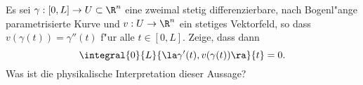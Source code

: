 \begin{prob}
Es sei $\gamma:[0,L]\to U\subset\R^n$ eine zweimal stetig differenzierbare, nach Bogenl"ange parametrisierte Kurve und $v:U\to\R^n$ ein stetiges Vektorfeld, so dass $v(\gamma(t))=\gamma''(t)$ f"ur alle $t\in[0,L]$.
Zeige, dass dann
$$
\integral{0}{L}{\la\gamma'(t),v(\gamma(t))\ra}{t}=0.
$$
Was ist die physikalische Interpretation dieser Aussage?
\end{prob}
